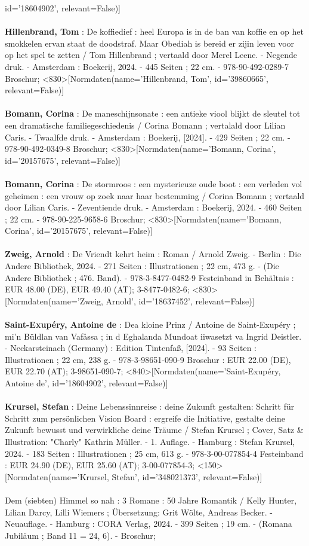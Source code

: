 \documentclass{article}
\begin{document}
\begin{multicols}{3}
id='18604902', relevant=False)]\\\\\textbf{Hillenbrand, Tom} : De koffiedief : heel Europa is in de ban van koffie en op het smokkelen ervan staat de doodstraf. Maar Obediah is bereid er zijin leven voor op het spel te zetten / Tom Hillenbrand ; vertaald door Merel Leene. - Negende druk. - Amsterdam : Boekerij, 2024. - 445 Seiten ; 22 cm. - 978-90-492-0289-7 Broschur; <830>[Normdaten(name='Hillenbrand, Tom', id='39860665', relevant=False)]\\\\\textbf{Bomann, Corina} : De maneschijnsonate : een antieke viool blijkt de sleutel tot een dramatische familiegeschiedenis  / Corina Bomann ; vertalald door Lilian Caris. - Twaalfde druk. - Amsterdam : Boekerij, [2024]. - 429 Seiten ; 22 cm. - 978-90-492-0349-8 Broschur; <830>[Normdaten(name='Bomann, Corina', id='20157675', relevant=False)]\\\\\textbf{Bomann, Corina} : De stormroos : een mysterieuze oude boot : een verleden vol geheimen : een vrouw op zoek naar haar bestemming / Corina Bomann ; vertaald door Lilian Caris. - Zeventiende druk. - Amsterdam : Boekerij, 2024. - 460 Seiten ; 22 cm. - 978-90-225-9658-6 Broschur; <830>[Normdaten(name='Bomann, Corina', id='20157675', relevant=False)]\\\\\textbf{Zweig, Arnold} : De Vriendt kehrt heim : Roman / Arnold Zweig. - Berlin : Die Andere Bibliothek, 2024. - 271 Seiten : Illustrationen ; 22 cm, 473 g. - (Die Andere Bibliothek ; 476. Band). - 978-3-8477-0482-9 Festeinband in Behältnis : EUR 48.00 (DE), EUR 49.40 (AT); 3-8477-0482-6; <830>[Normdaten(name='Zweig, Arnold', id='18637452', relevant=False)]\\\\\textbf{Saint-Exupéry, Antoine de} : Dea kloine Prinz / Antoine de Saint-Exupéry ; mi'n Büldlan van Vafåssa ; in d Eghalanda Mundoat iiwasetzt va Ingrid Deistler. - Neckarsteinach (Germany) : Edition Tintenfaß, [2024]. - 93 Seiten : Illustrationen ; 22 cm, 238 g. - 978-3-98651-090-9 Broschur : EUR 22.00 (DE), EUR 22.70 (AT); 3-98651-090-7; <840>[Normdaten(name='Saint-Exupéry, Antoine de', id='18604902', relevant=False)]\\\\\textbf{Krursel, Stefan} : Deine Lebenssinnreise : deine Zukunft gestalten: Schritt für Schritt zum persönlichen Vision Board : ergreife die Initiative, gestalte deine Zukunft bewusst und verwirkliche deine Träume / Stefan Krursel ; Cover, Satz \& Illustration: "Charly" Kathrin Müller. - 1. Auflage. - Hamburg : Stefan Krursel, 2024. - 183 Seiten : Illustrationen ; 25 cm, 613 g. - 978-3-00-077854-4 Festeinband : EUR 24.90 (DE), EUR 25.60 (AT); 3-00-077854-3; <150>[Normdaten(name='Krursel, Stefan', id='348021373', relevant=False)]\\\\Dem (siebten) Himmel so nah : 3 Romane : 50 Jahre Romantik / Kelly Hunter, Lilian Darcy, Lilli Wiemers ; Übersetzung: Grit Wölte, Andreas Becker. - Neuauflage. - Hamburg : CORA Verlag, 2024. - 399 Seiten ; 19 cm. - (Romana Jubiläum ; Band 11 = 24, 6). - Broschur; 
\end{multicols}
\end{document}
